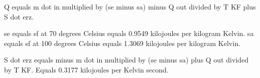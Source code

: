 Q equals m dot in multiplied by (se minus sa) minus Q out divided by T KF plus S dot erz.  

se equals sf at 70 degrees Celsius equals 0.9549 kilojoules per kilogram Kelvin.  
sa equals sf at 100 degrees Celsius equals 1.3069 kilojoules per kilogram Kelvin.  

S dot erz equals minus m dot in multiplied by (se minus sa) plus Q out divided by T KF.  
Equals 0.3177 kilojoules per Kelvin second.